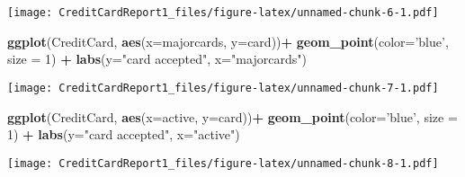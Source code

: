 \documentclass[]{article}
\newenvironment{Shaded}{\begin{snugshade}}{\end{snugshade}}
\newcommand{\DataTypeTok}[1]{\textcolor[rgb]{0.13,0.29,0.53}{#1}}
\newcommand{\DecValTok}[1]{\textcolor[rgb]{0.00,0.00,0.81}{#1}}
\newcommand{\KeywordTok}[1]{\textcolor[rgb]{0.13,0.29,0.53}{\textbf{#1}}}
\newcommand{\NormalTok}[1]{#1}
\newcommand{\OperatorTok}[1]{\textcolor[rgb]{0.81,0.36,0.00}{\textbf{#1}}}
\newcommand{\StringTok}[1]{\textcolor[rgb]{0.31,0.60,0.02}{#1}}
\begin{document}
\texttt{[image: CreditCardReport1\_files/figure-latex/unnamed-chunk-6-1.pdf]}

\begin{Shaded}
\begin{Highlighting}[]
\KeywordTok{ggplot}\NormalTok{(CreditCard, }\KeywordTok{aes}\NormalTok{(}\DataTypeTok{x=}\NormalTok{majorcards, }\DataTypeTok{y=}\NormalTok{card))}\OperatorTok{+}\StringTok{ }
\StringTok{  }\KeywordTok{geom_point}\NormalTok{(}\DataTypeTok{color=}\StringTok{'blue'}\NormalTok{, }\DataTypeTok{size =} \DecValTok{1}\NormalTok{) }\OperatorTok{+}\StringTok{ }
\StringTok{  }\KeywordTok{labs}\NormalTok{(}\DataTypeTok{y=}\StringTok{"card accepted"}\NormalTok{, }\DataTypeTok{x=}\StringTok{"majorcards"}\NormalTok{)}
\end{Highlighting}
\end{Shaded}

\texttt{[image: CreditCardReport1\_files/figure-latex/unnamed-chunk-7-1.pdf]}

\begin{Shaded}
\begin{Highlighting}[]
\KeywordTok{ggplot}\NormalTok{(CreditCard, }\KeywordTok{aes}\NormalTok{(}\DataTypeTok{x=}\NormalTok{active, }\DataTypeTok{y=}\NormalTok{card))}\OperatorTok{+}\StringTok{ }
\StringTok{  }\KeywordTok{geom_point}\NormalTok{(}\DataTypeTok{color=}\StringTok{'blue'}\NormalTok{, }\DataTypeTok{size =} \DecValTok{1}\NormalTok{) }\OperatorTok{+}\StringTok{ }
\StringTok{  }\KeywordTok{labs}\NormalTok{(}\DataTypeTok{y=}\StringTok{"card accepted"}\NormalTok{, }\DataTypeTok{x=}\StringTok{"active"}\NormalTok{)}
\end{Highlighting}
\end{Shaded}

\texttt{[image: CreditCardReport1\_files/figure-latex/unnamed-chunk-8-1.pdf]}
\end{document}
